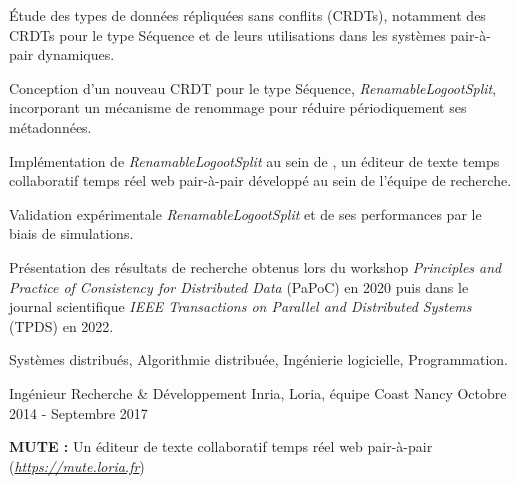 \begin{cventries}
\begin{cvparagraph}
    \medskip
    \begin{cvitems} %
        \item Étude des types de données répliquées sans conflits (CRDTs), notamment des CRDTs pour le type Séquence et de leurs utilisations dans les systèmes pair-à-pair dynamiques.
        \item Conception d'un nouveau CRDT pour le type Séquence, \emph{RenamableLogootSplit}, incorporant  un mécanisme de renommage pour réduire périodiquement ses métadonnées.
        \item Implémentation de \emph{RenamableLogootSplit} au sein de , un éditeur de texte temps collaboratif temps réel web pair-à-pair développé au sein de l'équipe de recherche.
        \item Validation expérimentale \emph{RenamableLogootSplit} et de ses performances par le biais de simulations.
        \item Présentation des résultats de recherche obtenus lors du workshop \emph{Principles and Practice of Consistency for Distributed Data} (PaPoC) en 2020 puis dans le journal scientifique \emph{IEEE Transactions on Parallel and Distributed Systems} (TPDS) en 2022.
    \end{cvitems}

    \bigskip
    \begin{description}[labelindent=1.6em,itemsep=-0.3em]
        \item {}
        \item {}
    \end{description}

    \medskip
     Systèmes distribués, Algorithmie distribuée, Ingénierie logicielle, Programmation.
\end{cvparagraph}

\vspace{1em}
\cventry
    {Ingénieur Recherche \& Développement} %
    {Inria, Loria, équipe Coast} %
    {Nancy} %
    {Octobre 2014 - Septembre 2017} %
    {}

\vspace{-1.5em}
\begin{cvparagraph}
    \textbf{MUTE :} Un éditeur de texte collaboratif temps réel web pair-à-pair (\href{https://mute.loria.fr}{\emph{https://mute.loria.fr}})


\end{cvparagraph}
\end{cventries}
